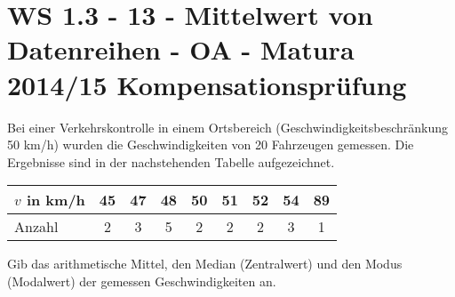 \section{WS 1.3 - 13 - Mittelwert von Datenreihen - OA - Matura 2014/15 Kompensationsprüfung}

\begin{beispiel}[WS 1.3]{1} %
				Bei einer Verkehrskontrolle in einem Ortsbereich (Geschwindigkeitsbeschränkung 50 km/h) wurden die Geschwindigkeiten von 20 Fahrzeugen gemessen. Die Ergebnisse sind in der nachstehenden Tabelle aufgezeichnet.
				\begin{center}
				\begin{tabular}{|l|c|c|c|c|c|c|c|c|}\hline
								$v$ in km/h&45&47&48&50&51&52&54&89\\ \hline
				Anzahl&2&3&5&2&2&2&3&1\\ \hline
				\end{tabular}
\end{center}

Gib das arithmetische Mittel, den Median (Zentralwert) und den Modus (Modalwert) der gemessen Geschwindigkeiten an.\\

\end{beispiel}